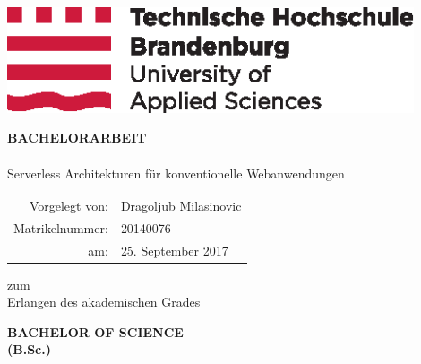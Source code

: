 \documentclass[
12pt,
english,
ngerman,
headsepline,
twoside,
openright,
numbers=noenddot,version=first
]{scrreprt}
\providecommand{\tabularnewline}{\\}
\begin{document}
\titlepage

\begin{center}
\includegraphics[width=12cm]{pics/2015_10_05_THB_Logo_CMYK_randlos}\vspace{0.5cm}

\par\end{center}

\vspace{1cm}

\noindent \begin{center}
\textsf{\textbf{\large BACHELORARBEIT}}\textsf{}\\

\textsf{}\\
\textsf{\huge Serverless Architekturen für konventionelle Webanwendungen}
\par\end{center}{\Large \par}

\vspace{2cm}

\noindent \begin{center}
{\huge }\begin{tabular}{rl}
Vorgelegt von: & Dragoljub Milasinovic\tabularnewline
Matrikelnummer: & 20140076\tabularnewline
am: & 25. September 2017\tabularnewline
\end{tabular}
\par\end{center}{\huge \par}

\vspace{1cm}

\noindent \begin{center}
zum \\
Erlangen des akademischen Grades\textsf{}\\
\par\end{center}
\noindent \begin{center}
\textsf{\textbf{\large BACHELOR OF SCIENCE}}\textsf{\textbf{\LARGE }}\\
\textsf{\textbf{(B.Sc.)}}
\par\end{center}
\end{document}
